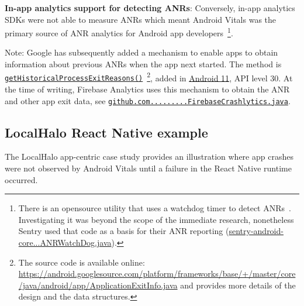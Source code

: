 \textbf{In-app analytics support for detecting ANRs}: 
Conversely, in-app analytics SDKs were not able to measure ANRs which meant Android Vitals was the primary source of ANR analytics for Android app developers~\footnote{There is an opensource utility that uses a watchdog timer to detect ANRs~\citep{salomonbrys_github_anr_watchdog}. Investigating it was beyond the scope of the immediate research, nonetheless Sentry used that code as a basis for their ANR reporting (\href{https://github.com/getsentry/sentry-java/blob/3f8d7b1cc869bb056c9db99b459e43f6c375784a/sentry-android-core/src/main/java/io/sentry/android/core/ANRWatchDog.java}{sentry-android-core...ANRWatchDog.java}).}. 

Note: Google has subsequently added a mechanism to enable apps to obtain information about previous ANRs when the app next started. The method is \href{https://developer.android.com/reference/kotlin/android/app/ActivityManager#gethistoricalprocessexitreasons}{\texttt{getHistoricalProcessExitReasons()}}~\footnote{The source code is available online: \url{https://android.googlesource.com/platform/frameworks/base/+/master/core/java/android/app/ApplicationExitInfo.java} and provides more details of the design and the data structures.}, added in \href{https://developer.android.com/about/versions/11}{Android 11}, API level 30.
%
At the time of writing, Firebase Analytics uses this mechanism to obtain the ANR and other app exit data, see \href{https://github.com/firebase/firebase-android-sdk/blob/73131b69b0134456441e7fa218964b6a766fcec7/firebase-crashlytics/src/main/java/com/google/firebase/crashlytics/FirebaseCrashlytics.java}{\texttt{github.com.........FirebaseCrashlytics.java}}.

\subsection{LocalHalo React Native example}
The LocalHalo app-centric case study provides an illustration where app crashes were not observed by Android Vitals until a failure in the React Native runtime occurred.

